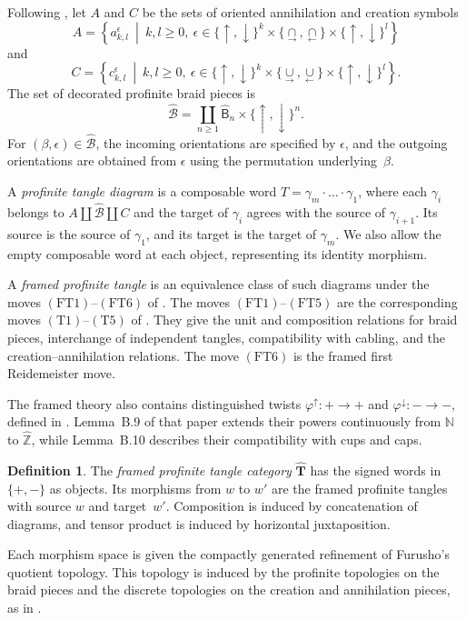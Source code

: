 \documentclass{amsart}
\newcommand{\bT}{\mathbf{T}}
\newcommand{\Br}{\mathsf{B}} %
\theoremstyle{definition}
\newtheorem{definition}[theorem]{Definition}%
\numberwithin{equation}{section}
\begin{document}
Following
\cite[Definitions~2.2 and~2.3]{furusho_galois_2017}, let $A$ and $C$
be the sets of oriented annihilation and creation symbols
\[
A=
\left\{
a^\epsilon_{k,l}
\ \middle|\
k,l\geq0,\ 
\epsilon\in
\{\uparrow,\downarrow\}^{k}
\times
\{\underset{\rightarrow}{\cap},
  \underset{\leftarrow}{\cap}\}
\times
\{\uparrow,\downarrow\}^{l}
\right\}
\]
and
\[
C=
\left\{
c^\epsilon_{k,l}
\ \middle|\
k,l\geq0,\ 
\epsilon\in
\{\uparrow,\downarrow\}^{k}
\times
\{\underset{\rightarrow}{\cup},
  \underset{\leftarrow}{\cup}\}
\times
\{\uparrow,\downarrow\}^{l}
\right\}.
\]
The set of decorated profinite braid pieces is
\[
\widehat{\mathcal B}
=
\coprod_{n\geq1}
\widehat{\Br}_n\times\{\uparrow,\downarrow\}^n.
\]
For $(\beta,\epsilon)\in\widehat{\mathcal B}$, the incoming
orientations are specified by $\epsilon$, and the outgoing
orientations are obtained from $\epsilon$ using the permutation
underlying~$\beta$.

A \emph{profinite tangle diagram} is a composable word
$T=\gamma_m\cdot\ldots\cdot\gamma_1$, where each
$\gamma_i$ belongs to
$A\amalg\widehat{\mathcal B}\amalg C$ and the target of
$\gamma_i$ agrees with the source of $\gamma_{i+1}$. Its source is
the source of $\gamma_1$, and its target is the target of
$\gamma_m$. We also allow the empty composable word at each
object, representing its identity morphism.

A \emph{framed profinite tangle} is an equivalence class of such
diagrams under the moves
$\mathrm{(FT1)}$--$\mathrm{(FT6)}$ of
\cite[Definition~B.1]{furusho_galois_2017}. The moves
$\mathrm{(FT1)}$--$\mathrm{(FT5)}$ are the corresponding moves
$\mathrm{(T1)}$--$\mathrm{(T5)}$ of
\cite[Definition~2.8]{furusho_galois_2017}. They give the unit and
composition relations for braid pieces, interchange of independent
tangles, compatibility with cabling, and the creation--annihilation
relations. The move $\mathrm{(FT6)}$ is the framed first
Reidemeister move.

The framed theory also contains distinguished twists
$\varphi^\uparrow\colon+\to+$ and
$\varphi^\downarrow\colon-\to-$, defined in
\cite[Definition~B.3]{furusho_galois_2017}. Lemma~B.9 of that paper
extends their powers continuously from $\mathbb N$ to
$\widehat{\mathbb Z}$, while Lemma~B.10 describes their compatibility
with cups and caps.

\begin{definition}
The \emph{framed profinite tangle category} $\widehat{\bT}$ has the
signed words in $\{+,-\}$ as objects. Its morphisms from $w$ to $w'$
are the framed profinite tangles with source $w$ and target~$w'$.
Composition is induced by concatenation of diagrams, and tensor
product is induced by horizontal juxtaposition.

Each morphism space is given the compactly generated refinement of
Furusho's quotient topology. This topology is induced by the
profinite topologies on the braid pieces and the discrete topologies
on the creation and annihilation pieces, as in
\cite[Note~2.10 and Appendix~B]{furusho_galois_2017}.
\end{definition}
\end{document}
